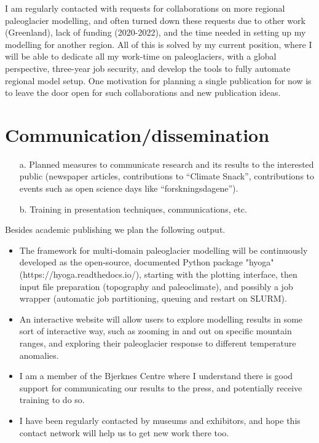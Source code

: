 \documentclass{article}
\newcommand{\guideline}[1]{{\color{color2}\itshape{#1}}}
\begin{document}
    I am regularly contacted with requests for collaborations on more regional
    paleoglacier modelling, and often turned down these requests due to other
    work (Greenland), lack of funding (2020-2022), and the time needed in
    setting up my modelling for another region. All of this is solved by my
    current position, where I will be able to dedicate all my work-time on
    paleoglaciers, with a global perspective, three-year job security, and
    develop the tools to fully automate regional model setup. One motivation
    for planning a single publication for now is to leave the door open for
    such collaborations and new publication ideas.


\section{Communication/dissemination}

    \guideline{
        \begin{itemize}
          \item[a.] Planned measures to communicate research and its results to
            the interested public (newspaper articles, contributions to
            ``Climate Snack'', contributions to events such as open science
            days like ``forskningsdagene'').
          \item[b.] Training in presentation techniques, communications, etc.
        \end{itemize}}

    Besides academic publishing we plan the following output.

    \begin{itemize}
      \item The framework for multi-domain paleoglacier modelling will be
        continuously developed as the open-source, documented Python package
        "hyoga" (https://hyoga.readthedocs.io/), starting with the plotting
        interface, then input file preparation (topography and paleoclimate),
        and possibly a job wrapper (automatic job partitioning, queuing and
        restart on SLURM).
      \item An interactive website will allow users to explore modelling
        results in some sort of interactive way, such as zooming in and out on
        specific mountain ranges, and exploring their paleoglacier response to
        different temperature anomalies.
      \item I am a member of the Bjerknes Centre where I understand there is
        good support for communicating our results to the press, and
        potentially receive training to do so.
      \item I have been regularly contacted by museums and exhibitors, and hope
        this contact network will help us to get new work there too.
    \end{itemize}
\end{document}
